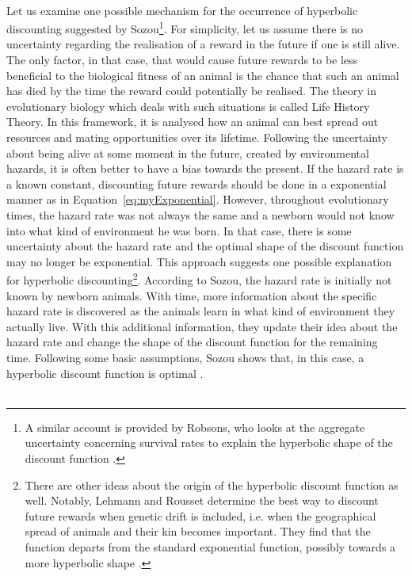 \documentclass[a4paper,10pt]{article}
\numberwithin{equation}{section}
\begin{document}
\\
Let us examine one possible mechanism for the occurrence of hyperbolic discounting suggested by Sozou\footnote{A similar account is provided by Robsons, who looks at the aggregate uncertainty concerning survival rates to explain the hyperbolic shape of the discount function \cite{Robson2009}.}. For simplicity, let us assume there is no uncertainty regarding the realisation of a reward in the future if one is still alive. The only factor, in that case, that would cause future rewards to be less beneficial to the biological fitness of an animal is the chance that such an animal has died by the time the reward could potentially be realised. The theory in evolutionary biology which deals with such situations is called Life History Theory. In this framework, it is analysed how an animal can best spread out resources and mating opportunities over its lifetime. Following the uncertainty about being alive at some moment in the future, created by environmental hazards, it is often better to have a bias towards the present. If the hazard rate is a known constant, discounting future rewards should be done in a exponential manner as in Equation~\ref{eq:myExponential}. However, throughout evolutionary times, the hazard rate was not always the same and a newborn would not know into what kind of environment he was born. In that case, there is some uncertainty about the hazard rate and the optimal shape of the discount function may no longer be exponential. This approach suggests one possible explanation for hyperbolic discounting\footnote{There are other ideas about the origin of the hyperbolic discount function as well. Notably, Lehmann and Rousset determine the best way to discount future rewards when genetic drift is included, i.e. when the geographical spread of animals and their kin becomes important. They find that the function departs from the standard exponential function, possibly towards a more hyperbolic shape \cite{Lehmann2011}.}. According to Sozou, the hazard rate is initially not known by newborn animals. With time, more information about the specific hazard rate is discovered as the animals learn in what kind of environment they actually live. With this additional information, they update their idea about the hazard rate and change the shape of the discount function for the remaining time. Following some basic assumptions, Sozou shows that, in this case, a hyperbolic discount function is optimal \cite{Sozou1998}.\\
\\
\end{document}
